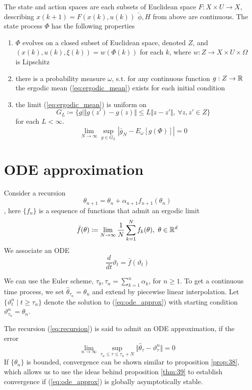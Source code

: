 The state and action spaces are each subsets of Euclidean space \(F:X\times U\to X\), describing \(x(k+1)=F(x(k),u(k))\) 
\(\breve{\phi},H\) from above are continuous. The state process \(\Phi\) has the following properties 
\begin{enumerate}
    \item \(\Phi\) evolves on a closed subset of Euclidean space, denoted \(Z\), and \((x(k),u(k),\xi(k))=w(\Phi(k))\) 
           for each \(k\), where \(w:Z\to X\times U\times \Omega\) is Lipschitz
    \item there is a probability measure \(\omega\), s.t. for any continuous function \(g:Z\to\mathbb{R}\) the ergodic mean (\ref{eq:ergodic_mean}) exists for each initial condition 
    \item the limit (\ref{eq:ergodic_mean}) is uniform on\[G_L\coloneqq \{g\mid\Vert g(z')-g(z)\Vert \leq L\Vert z-z'\Vert,\ \forall z,z'\in Z\}\] for each \(L<\infty\).
        \[\lim_{N\to\infty}\sup_{g\in G_L}|\bar{g}_N-E_\omega[g(\Phi)]|=0\]
\end{enumerate}

\section{ODE approximation}

Consider a recursion \begin{equation}\label{eq:recursion}\theta_{n+1}=\theta_n+\alpha_{n+1}f_{n+1}(\theta_n)\end{equation}, here \(\{f_n\}\) is a 
sequence of functions that admit an ergodic limit 
\[\bar{f}(\theta)\coloneqq \lim_{N\to\infty}\frac{1}{N}\sum_{k=1}^N f_k(\theta),\ \theta\in\R^d\]
We associate an ODE 
 \begin{equation}\label{eq:ode_approx}
    \frac{d}{dt}\vartheta_t=\bar{f}(\vartheta_t)
\end{equation}

We can use the Euler scheme, \(\tau_0,\tau_n=\sum_{k=1}^n\alpha_k\), for \(n\geq 1\).
To get a continuous time process, we set \(\hat{\theta}_{\tau_n}=\theta_n\) and 
extend by piecewise linear interpolation. Let \(\{\vartheta_t^n\mid t\geq \tau_n\}\) denote the solution to 
(\ref{eq:ode_approx}) with starting condition \(\vartheta_{\tau_n}^n=\theta_n\).

The recursion (\ref{eq:recursion}) is said to admit an ODE approximation, if the error
\[\lim_{n\to\infty}\sup_{\tau_n\leq \tau\leq \tau_n+N}\Vert \hat{\theta}_\tau-\vartheta_\tau^n\Vert=0\]
If \(\{\theta_n\}\) is bounded, 
convergence can be shown similar to proposition \ref{prop:38}, which allows us
to use the ideas behind proposition \ref{thm:39}%
to establish convergence if (\ref{eq:ode_approx})
is globally asymptotically stable.

